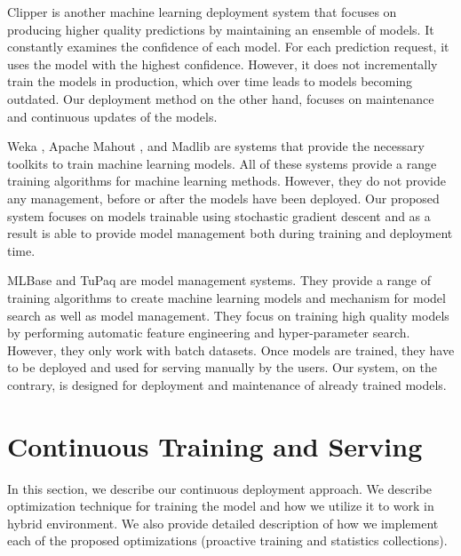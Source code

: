 Clipper \cite{crankshaw2016clipper} is another machine learning deployment system that focuses on producing higher quality predictions by maintaining an ensemble of models.
It constantly examines the confidence of each model.
For each prediction request, it uses the model with the highest confidence.
However, it does not incrementally train the models in production, which over time leads to models becoming outdated.
Our deployment method on the other hand, focuses on maintenance and continuous updates of the models.

Weka \cite{hall2009weka}, Apache Mahout \cite{Owen:2011:MA:2132656}, and Madlib \cite{hellerstein2012madlib} are systems that provide the necessary toolkits to train machine learning models. 
All of these systems provide a range training algorithms for machine learning methods. 
However, they do not provide any management, before or after the models have been deployed. 
Our proposed system focuses on models trainable using stochastic gradient descent and as a result is able to provide model management both during training and deployment time.

MLBase \cite{kraska2013mlbase} and TuPaq \cite{sparks2015tupaq} are model management systems.
They provide a range of training algorithms to create machine learning models and mechanism for model search as well as model management.
They focus on training high quality models by performing automatic feature engineering and hyper-parameter search.
However, they only work with batch datasets.
Once models are trained, they have to be deployed and used for serving manually by the users.
Our system, on the contrary, is designed for deployment and maintenance of already trained models.


\section{Continuous Training and Serving} \label{continious-training-serving}
In this section, we describe our continuous deployment approach.
We describe optimization technique for training the model and how we utilize it to work in hybrid environment.
We also provide detailed description of how we implement each of the proposed optimizations (proactive training and statistics collections).

